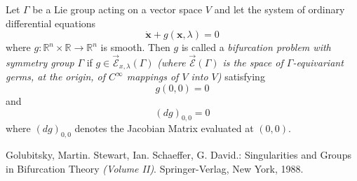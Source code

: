 \documentclass[12pt]{article}
\begin{document}
Let $\Gamma$ be a Lie group acting on a vector space $V$ and let the system of ordinary differential equations $$\dot{\mathbf{x}} + g(\mathbf{x},\lambda)=0$$ where $g\colon\mathbb{R}^n \times \mathbb{R} \to \mathbb{R}^n$ is smooth.  Then $g$ is called a \emph{bifurcation problem with symmetry group} $\Gamma$ if $g\in \vec{\mathcal{E}}_{x,\lambda}(\Gamma)$ \textit{(where $\vec{\mathcal{E}}(\Gamma)$ is the space of $\Gamma$-equivariant germs, at the origin, of $C^\infty$ mappings of $V$ into $V$)} satisfying 
$$g(0,0)=0$$ 
and 
$$(dg)_{0,0} = 0$$
where $(dg)_{0,0}$ denotes the Jacobian Matrix evaluated at $(0,0)$.
\cite{1}
\begin{thebibliography}{1}
 Golubitsky, Martin. Stewart, Ian. Schaeffer, G. David.: Singularities and Groups in Bifurcation Theory \textit{(Volume II)}. Springer-Verlag, New York, 1988.
\end{thebibliography}
\end{document}

